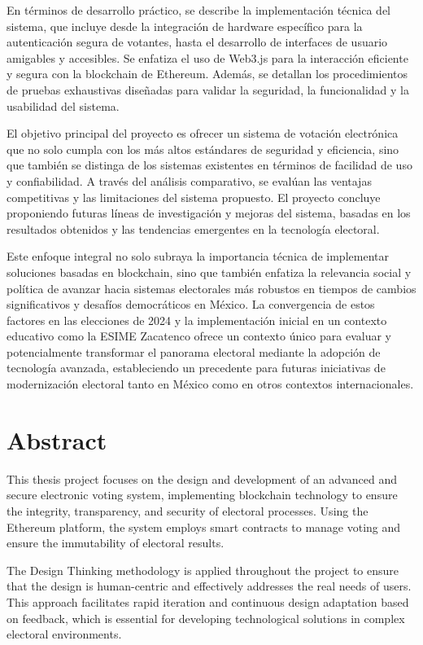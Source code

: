 \documentclass{report}
\begin{document}
	En términos de desarrollo práctico, se describe la implementación técnica del sistema, que incluye desde la integración de hardware específico para la autenticación segura de votantes, hasta el desarrollo de interfaces de usuario amigables y accesibles. Se enfatiza el uso de Web3.js para la interacción eficiente y segura con la blockchain de Ethereum. Además, se detallan los procedimientos de pruebas exhaustivas diseñadas para validar la seguridad, la funcionalidad y la usabilidad del sistema.
	
	El objetivo principal del proyecto es ofrecer un sistema de votación electrónica que no solo cumpla con los más altos estándares de seguridad y eficiencia, sino que también se distinga de los sistemas existentes en términos de facilidad de uso y confiabilidad. A través del análisis comparativo, se evalúan las ventajas competitivas y las limitaciones del sistema propuesto. El proyecto concluye proponiendo futuras líneas de investigación y mejoras del sistema, basadas en los resultados obtenidos y las tendencias emergentes en la tecnología electoral.
	
	Este enfoque integral no solo subraya la importancia técnica de implementar soluciones basadas en blockchain, sino que también enfatiza la relevancia social y política de avanzar hacia sistemas electorales más robustos en tiempos de cambios significativos y desafíos democráticos en México. La convergencia de estos factores en las elecciones de 2024 y la implementación inicial en un contexto educativo como la ESIME Zacatenco ofrece un contexto único para evaluar y potencialmente transformar el panorama electoral mediante la adopción de tecnología avanzada, estableciendo un precedente para futuras iniciativas de modernización electoral tanto en México como en otros contextos internacionales.
	
	\chapter*{Abstract}
	
	This thesis project focuses on the design and development of an advanced and secure electronic voting system, implementing blockchain technology to ensure the integrity, transparency, and security of electoral processes. Using the Ethereum platform, the system employs smart contracts to manage voting and ensure the immutability of electoral results.
	
	The Design Thinking methodology is applied throughout the project to ensure that the design is human-centric and effectively addresses the real needs of users. This approach facilitates rapid iteration and continuous design adaptation based on feedback, which is essential for developing technological solutions in complex electoral environments.
	
\end{document}
